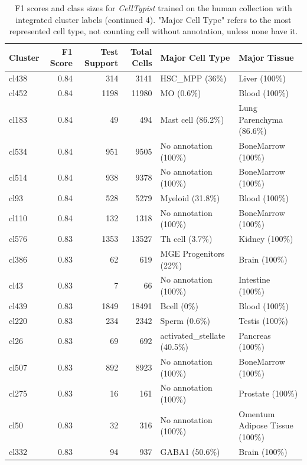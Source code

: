 \begin{table}[ht!]
\scriptsize
\caption[F1 scores and class sizes for \textit{CellTypist} trained on the human collection with integrated cluster labels (continued 4)]{F1 scores and class sizes for \textit{CellTypist} trained on the human collection with integrated cluster labels (continued 4). "Major Cell Type" refers to the most represented cell type, not counting cell without annotation, unless none have it.}
\centering
\label{table:tab_HAmodelclust4 (continued 5)}
\begin{tabular}{lrrrll}
  \toprule
Cluster & F1 Score & Test Support & Total Cells & Major Cell Type & Major Tissue \\ 
  \midrule
  cl438 & 0.84 & 314 & 3141 & HSC\_MPP (36\%) & Liver (100\%) \\ 
  cl452 & 0.84 & 1198 & 11980 & MO (0.6\%) & Blood (100\%) \\ 
  cl183 & 0.84 &  49 & 494 & Mast cell (86.2\%) & Lung Parenchyma (86.6\%) \\ 
  cl534 & 0.84 & 951 & 9505 & No annotation (100\%) & BoneMarrow (100\%) \\ 
  cl514 & 0.84 & 938 & 9378 & No annotation (100\%) & BoneMarrow (100\%) \\ 
  cl93 & 0.84 & 528 & 5279 & Myeloid (31.8\%) & Blood (100\%) \\ 
  cl110 & 0.84 & 132 & 1318 & No annotation (100\%) & BoneMarrow (100\%) \\ 
  cl576 & 0.83 & 1353 & 13527 & Th cell (3.7\%) & Kidney (100\%) \\ 
  cl386 & 0.83 &  62 & 619 & MGE Progenitors (22\%) & Brain (100\%) \\ 
  cl43 & 0.83 &   7 &  66 & No annotation (100\%) & Intestine (100\%) \\ 
  cl439 & 0.83 & 1849 & 18491 & Bcell (0\%) & Blood (100\%) \\ 
  cl220 & 0.83 & 234 & 2342 & Sperm (0.6\%) & Testis (100\%) \\ 
  cl26 & 0.83 &  69 & 692 & activated\_stellate (40.5\%) & Pancreas (100\%) \\ 
  cl507 & 0.83 & 892 & 8923 & No annotation (100\%) & BoneMarrow (100\%) \\ 
  cl275 & 0.83 &  16 & 161 & No annotation (100\%) & Prostate (100\%) \\ 
  cl50 & 0.83 &  32 & 316 & No annotation (100\%) & Omentum Adipose Tissue (100\%) \\ 
  cl332 & 0.83 &  94 & 937 & GABA1 (50.6\%) & Brain (100\%) \\ 

\end{tabular}
\end{table}
